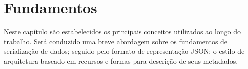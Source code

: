 \chapter{Fundamentos}

Neste capítulo são estabelecidos os principais conceitos utilizados ao longo do trabalho. Será conduzido uma breve abordagem sobre os fundamentos de serialização de dados; seguido pelo formato de representação JSON; o estilo de arquitetura baseado em recursos e formas para descrição de seus metadados.






